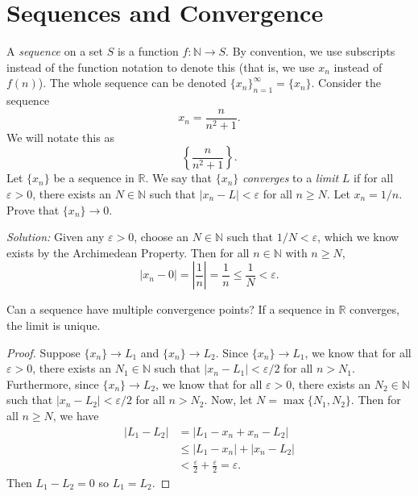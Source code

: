 \documentclass[11pt]{article}
\theoremstyle{definition}
\newcommand{\R}{\mathbb{R}}                      %
\newcommand{\N}{\mathbb{N}}
\begin{document}
\section{Sequences and Convergence}
 A \textit{sequence} on a set $S$ is a function $f:\N\to S$. By convention, we use subscripts instead of the function notation to denote this (that is, we use $x_n$ instead of $f(n)$). The whole sequence can be denoted $\{x_n\}_{n=1}^\infty = \{x_n\}$.
\ex Consider the sequence
$$
x_n=\frac{n}{n^2+1}.
$$
We will notate this as 
$$
\left\{\frac{n}{n^2+1}\right\}.
$$
 Let $\{x_n\}$ be a sequence in $\R$. We say that $\{x_n\}$ \textit{converges} to a \textit{limit} $L$ if for all $\varepsilon>0$, there exists an $N\in\N$ such that $|x_n-L|<\varepsilon$ for all $n\geq N$.
\ex Let $x_n=1/n$. Prove that  $\{x_n\}\to 0$.

\textit{Solution:} Given any $\varepsilon>0$, choose an $N\in \N$ such that $1/N<\varepsilon$, which we know exists by the Archimedean Property. Then for all $n\in \N$ with $n\geq N$,
$$
|x_n-0|=\left|\frac{1}{n}\right|=\frac{1}{n}\leq \frac{1}{N}<\varepsilon.
$$

Can a sequence have multiple convergence points?
\prop If a sequence in $\R$ converges, the limit is unique.

\begin{proof}
    Suppose $\{x_n\}\to L_1$ and $\{x_n\}\to L_2$. Since $\{x_n\}\to L_1$, we know that for all $\varepsilon>0$, there exists an $N_1\in\N$ such that $|x_n-L_1|<\varepsilon/2$ for all $n>N_1$. Furthermore, since $\{x_n\}\to L_2$, we know that for all $\varepsilon>0$, there exists an $N_2\in\N$ such that $|x_n-L_2|<\varepsilon/2$ for all $n>N_2$. Now, let $N=\max \{N_1,N_2\}$. Then for all $n\geq N$, we have
    $$
    \begin{aligned}
    |L_1-L_2|&=|L_1-x_n+x_n-L_2|\\
    &\leq |L_1-x_n|+|x_n-L_2|\\
    &<\frac{\varepsilon}{2} +\frac{\varepsilon}{2}=\varepsilon.
    \end{aligned}
    $$
    Then $L_1-L_2=0$ so $L_1=L_2$.
\end{proof}
\end{document}
